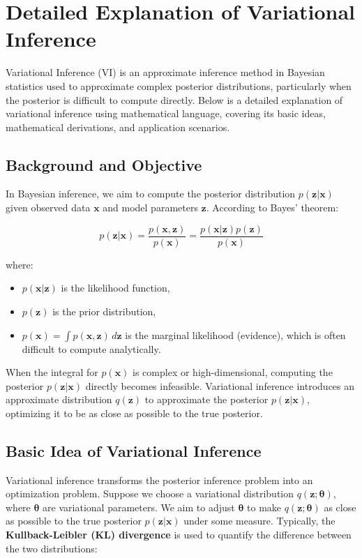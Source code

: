 \documentclass[10pt]{elegantbook}
\begin{document}
\section{Detailed Explanation of Variational Inference}

Variational Inference (VI) is an approximate inference method in Bayesian statistics used to approximate complex posterior distributions, particularly when the posterior is difficult to compute directly. Below is a detailed explanation of variational inference using mathematical language, covering its basic ideas, mathematical derivations, and application scenarios.

\subsection{Background and Objective}

In Bayesian inference, we aim to compute the posterior distribution \( p(\mathbf{z} | \mathbf{x}) \) given observed data \( \mathbf{x} \) and model parameters \( \mathbf{z} \). According to Bayes' theorem:

\[
p(\mathbf{z} | \mathbf{x}) = \frac{p(\mathbf{x}, \mathbf{z})}{p(\mathbf{x})} = \frac{p(\mathbf{x} | \mathbf{z}) p(\mathbf{z})}{p(\mathbf{x})}
\]

where:
\begin{itemize}
    \item \( p(\mathbf{x} | \mathbf{z}) \) is the likelihood function,
    \item \( p(\mathbf{z}) \) is the prior distribution,
    \item \( p(\mathbf{x}) = \int p(\mathbf{x}, \mathbf{z}) \, d\mathbf{z} \) is the marginal likelihood (evidence), which is often difficult to compute analytically.
\end{itemize}

When the integral for \( p(\mathbf{x}) \) is complex or high-dimensional, computing the posterior \( p(\mathbf{z} | \mathbf{x}) \) directly becomes infeasible. Variational inference introduces an approximate distribution \( q(\mathbf{z}) \) to approximate the posterior \( p(\mathbf{z} | \mathbf{x}) \), optimizing it to be as close as possible to the true posterior.

\subsection{Basic Idea of Variational Inference}

Variational inference transforms the posterior inference problem into an optimization problem. Suppose we choose a variational distribution \( q(\mathbf{z}; \boldsymbol{\theta}) \), where \( \boldsymbol{\theta} \) are variational parameters. We aim to adjust \( \boldsymbol{\theta} \) to make \( q(\mathbf{z}; \boldsymbol{\theta}) \) as close as possible to the true posterior \( p(\mathbf{z} | \mathbf{x}) \) under some measure. Typically, the \textbf{Kullback-Leibler (KL) divergence} is used to quantify the difference between the two distributions:
\end{document}
